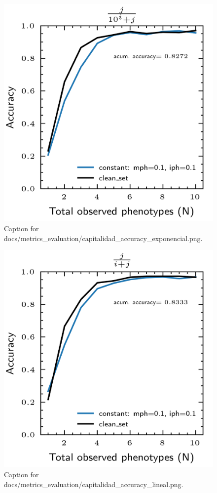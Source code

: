 \documentclass{article}
\begin{document}
\begin{figure}[h] \centering \includegraphics{docs/metrics_evaluation/capitalidad_accuracy_exponencial.png} \caption{Caption for docs/metrics_evaluation/capitalidad_accuracy_exponencial.png.} \end{figure}
\begin{figure}[h] \centering \includegraphics{docs/metrics_evaluation/capitalidad_accuracy_lineal.png} \caption{Caption for docs/metrics_evaluation/capitalidad_accuracy_lineal.png.} \end{figure}
\end{document}
